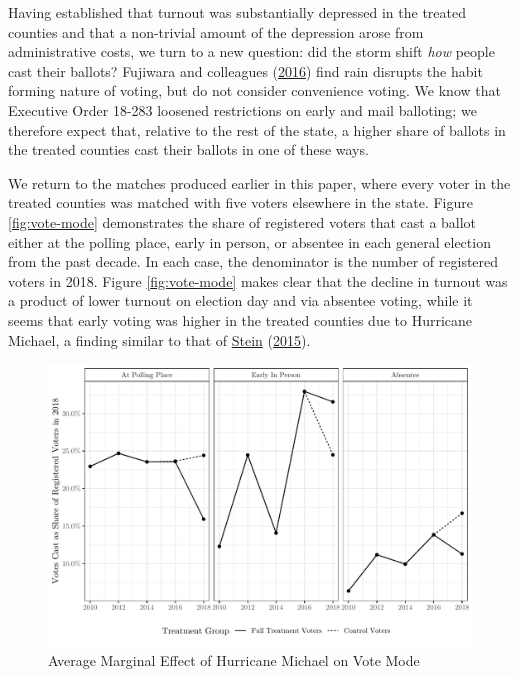 \documentclass[
  12pt,
]{article}
\begin{document}
Having established that turnout was substantially depressed in the treated counties and that a non-trivial amount of the depression arose from administrative costs, we turn to a new question: did the storm shift \emph{how} people cast their ballots? Fujiwara and colleagues (\protect\hyperlink{ref-Fujiwara2016}{2016}) find rain disrupts the habit forming nature of voting, but do not consider convenience voting. We know that Executive Order 18-283 loosened restrictions on early and mail balloting; we therefore expect that, relative to the rest of the state, a higher share of ballots in the treated counties cast their ballots in one of these ways.

We return to the matches produced earlier in this paper, where every voter in the treated counties was matched with five voters elsewhere in the state. Figure \ref{fig:vote-mode} demonstrates the share of registered voters that cast a ballot either at the polling place, early in person, or absentee in each general election from the past decade. In each case, the denominator is the number of registered voters in 2018. Figure \ref{fig:vote-mode} makes clear that the decline in turnout was a product of lower turnout on election day and via absentee voting, while it seems that early voting was higher in the treated counties due to Hurricane Michael, a finding similar to that of \protect\hyperlink{ref-Stein2015}{Stein} (\protect\hyperlink{ref-Stein2015}{2015}).

\begin{figure}[h]

{\centering \includegraphics{hurricane_michael_files/figure-latex/vote-mode-chunk-1} 

}

\caption{\label{fig:vote-mode}Average Marginal Effect of Hurricane Michael on Vote Mode}\label{fig:vote-mode-chunk}
\end{figure}
\end{document}
